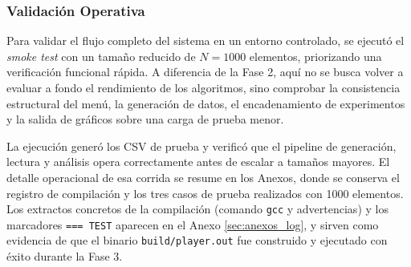 \subsubsection{Validación Operativa}\label{sec:validacion_operativa}
Para validar el flujo completo del sistema en un entorno controlado, se ejecutó el \textit{smoke test} con un tamaño reducido de $N=1000$ elementos, priorizando una verificación funcional rápida. A diferencia de la Fase 2, aquí no se busca volver a evaluar a fondo el rendimiento de los algoritmos, sino comprobar la consistencia estructural del menú, la generación de datos, el encadenamiento de experimentos y la salida de gráficos sobre una carga de prueba menor.

La ejecución generó los CSV de prueba y verificó que el pipeline de generación, lectura y análisis opera correctamente antes de escalar a tamaños mayores. El detalle operacional de esa corrida se resume en los Anexos, donde se conserva el registro de compilación y los tres casos de prueba realizados con 1000 elementos. Los extractos concretos de la compilación (comando \texttt{gcc} y advertencias) y los marcadores \texttt{=== TEST} aparecen en el Anexo \ref{sec:anexos_log}, y sirven como evidencia de que el binario \texttt{build/player.out} fue construido y ejecutado con éxito durante la Fase 3.
